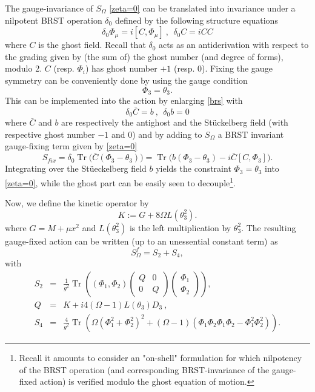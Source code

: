 \documentclass[a4paper,11pt,twoside]{article}
\numberwithin{equation}{section}
\DeclareMathOperator{\tr}{Tr}
\theoremstyle{nonumberplain}
\newcounter{and}
\begin{document}
%
The gauge-invariance of $S_\Omega$ \eqref{zeta=0} can be translated into invariance under a nilpotent BRST operation $\delta_0$ defined by the following structure equations \cite{MVW13}%
%
\begin{equation}
\delta_0 \Phi_\mu = i [C,\Phi_\mu] \ , \ \ \delta_0C=iCC\label{brs}
\end{equation}
%
where $C$ is the ghost field. Recall that $\delta_0$ acts as an antiderivation with respect to the grading given by (the sum of) the ghost number (and degree of forms), modulo 2. $C$ (resp. $\Phi_i$) has ghost number $+1$ (resp. $0$). Fixing the gauge symmetry can be conveniently done by using the gauge condition 
\begin{equation}
\Phi_3=\theta_3\label{special-gauge}.
\end{equation}
This can be implemented into the action by enlarging \eqref{brs} with%
%
\begin{equation}
\delta_0 {\bar{C}} = b \ , \ \ \delta_0b = 0 \label{contractible-brs}
\end{equation}
%
where ${\bar{C}}$ and $b$ are respectively the antighost and the St\"uckelberg field (with respective ghost number $-1$ and $0$) and by adding to $S_\Omega$ a BRST invariant gauge-fixing term given by \eqref{zeta=0}%
%
\begin{equation}
S_{fix}=\delta_0\tr\big({\bar{C}}(\Phi_3-\theta_3) \big)=\tr\big(b(\Phi_3-\theta_3)-i{\bar{C}}[C,\Phi_3]\big)\label{gauge-fix}.
\end{equation}
%
Integrating over the St\"ueckelberg field $b$ yields the constraint $\Phi_3=\theta_3$ into \eqref{zeta=0}, while the ghost part can be easily seen to decouple{\footnote{Recall it amounts to consider an "on-shell" formulation for which nilpotency of the BRST operation (and corresponding BRST-invariance of the gauge-fixed action) is verified modulo the ghost equation of motion.}}. \par 
Now, we define the kinetic operator by%
%
\begin{equation}
K:=G+8\Omega L(\theta_3^2)\label{operator-K}.
\end{equation}
where $G=M+\mu x^2$ and $L(\theta^{2}_{3})$ is the left multiplication by $\theta^{2}_{3}$.
%
The resulting gauge-fixed action can be written (up to an unessential constant term) as
%
\begin{equation}
S^f_\Omega=S_2+S_4\label{stot},
\end{equation}
with%
\begin{eqnarray}
S_2 &=& \frac{1}{g^2} \tr ((\Phi_1,\Phi_2)
\begin{pmatrix}
Q&0\\
0&Q
\end{pmatrix} 
\begin{pmatrix}
\Phi_1\\
\Phi_2
\end{pmatrix} 
) , \nonumber \\
Q &=& K + i4 (\Omega-1) L(\theta_3) D_3 \ , \label{squad1} \\[5pt]
S_4 &=& \frac{4}{g^2} \tr \left( \Omega (\Phi_1^2 + \Phi_2^2)^2 + (\Omega-1)(\Phi_1\Phi_2\Phi_1\Phi_2 - \Phi_1^2\Phi_2^2) \right) . \label{squart}
\end{eqnarray}
\end{document}
